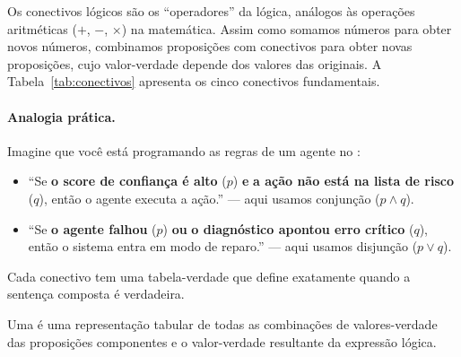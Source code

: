 Os conectivos lógicos são os ``operadores'' da lógica, análogos às operações
aritméticas ($+$, $-$, $\times$) na matemática. Assim como somamos números
para obter novos números, combinamos proposições com conectivos para obter
novas proposições, cujo valor-verdade depende dos valores das originais.
A Tabela~\ref{tab:conectivos} apresenta os cinco conectivos fundamentais.

\paragraph{Analogia prática.} Imagine que você está programando as regras de
um agente no \opencodeeco{}:
\begin{itemize}
    \item ``Se \textbf{o score de confiança é alto} ($p$) \textbf{e}
          \textbf{a ação não está na lista de risco} ($q$), então o agente
          executa a ação.'' — aqui usamos conjunção ($p \land q$).
    \item ``Se \textbf{o agente falhou} ($p$) \textbf{ou} \textbf{o
          diagnóstico apontou erro crítico} ($q$), então o sistema entra em
          modo de reparo.'' — aqui usamos disjunção ($p \lor q$).
\end{itemize}
Cada conectivo tem uma tabela-verdade que define exatamente quando a
sentença composta é verdadeira.

\begin{table}[htb]
    \centering
    \small
    \caption{Conectivos lógicos fundamentais}
\end{table}

\begin{definicao}
    Uma  é uma representação tabular de todas as
    combinações de valores-verdade das proposições componentes e o
    valor-verdade resultante da expressão lógica.
\end{definicao}

